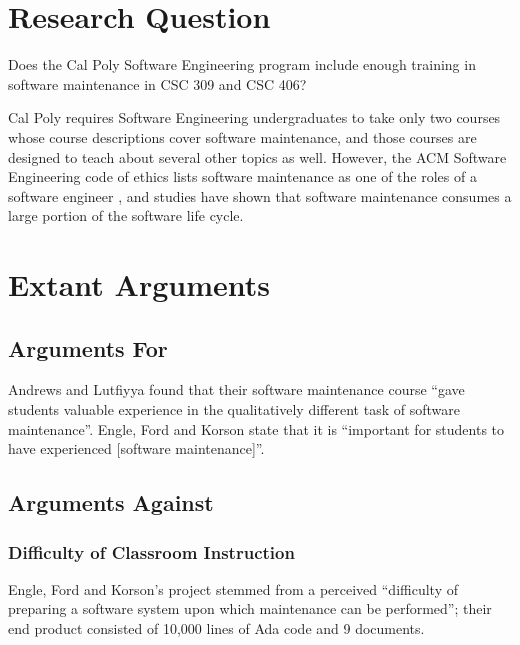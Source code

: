 \documentclass[11pt]{article}
\begin{document}
\begin{multicols}{2}
\section{Research Question}

Does the Cal Poly Software Engineering program include enough training in software maintenance in CSC 309 and CSC 406?

Cal Poly requires Software Engineering undergraduates to take only two courses whose course descriptions cover software maintenance, and those courses are designed to teach about several other topics as well. \cite{catalogCourses}  However, the ACM Software Engineering code of ethics lists software maintenance as one of the roles of a software engineer \cite{secode}, and studies have shown that software maintenance consumes a large portion of the software life cycle. \cite{stark97} \cite{parekh}

\section{Extant Arguments}

\subsection{Arguments For}

Andrews and Lutfiyya found that their software maintenance course ``gave students valuable experience in the qualitatively different task of software maintenance''. \cite{andrews}  Engle, Ford and Korson state that it is ``important for students to have experienced [software maintenance]''. \cite{engle}

\subsection{Arguments Against}

\subsubsection{Difficulty of Classroom Instruction}

Engle, Ford and Korson's project stemmed from a perceived ``difficulty of preparing a software system upon which maintenance can be performed''; their end product consisted of 10,000 lines of Ada code and 9 documents. \cite{engle}


\end{multicols}
\end{document}
